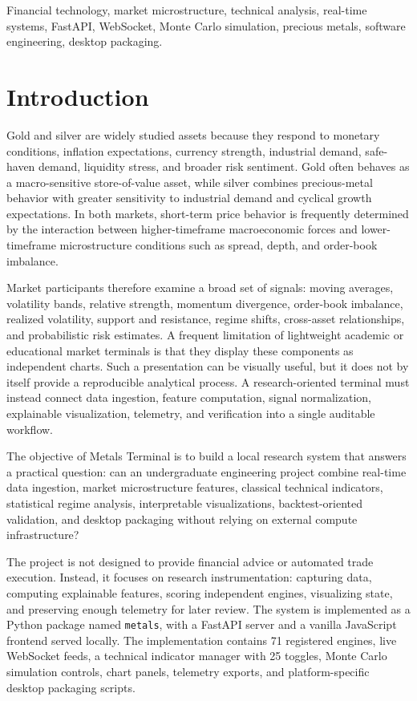 \documentclass[conference]{IEEEtran}
\begin{document}
\begin{IEEEkeywords}
Financial technology, market microstructure, technical analysis, real-time
systems, FastAPI, WebSocket, Monte Carlo simulation, precious metals, software
engineering, desktop packaging.
\end{IEEEkeywords}

\section{Introduction}

Gold and silver are widely studied assets because they respond to monetary
conditions, inflation expectations, currency strength, industrial demand,
safe-haven demand, liquidity stress, and broader risk sentiment. Gold often
behaves as a macro-sensitive store-of-value asset, while silver combines
precious-metal behavior with greater sensitivity to industrial demand and
cyclical growth expectations. In both markets, short-term price behavior is
frequently determined by the interaction between higher-timeframe
macroeconomic forces and lower-timeframe microstructure conditions such as
spread, depth, and order-book imbalance.

Market participants therefore examine a broad set of signals: moving
averages, volatility bands, relative strength, momentum divergence,
order-book imbalance, realized volatility, support and resistance, regime
shifts, cross-asset relationships, and probabilistic risk estimates. A
frequent limitation of lightweight academic or educational market terminals
is that they display these components as independent charts. Such a
presentation can be visually useful, but it does not by itself provide a
reproducible analytical process. A research-oriented terminal must instead
connect data ingestion, feature computation, signal normalization,
explainable visualization, telemetry, and verification into a single
auditable workflow.

The objective of Metals Terminal is to build a local research system that
answers a practical question: can an undergraduate engineering project
combine real-time data ingestion, market microstructure features, classical
technical indicators, statistical regime analysis, interpretable
visualizations, backtest-oriented validation, and desktop packaging without
relying on external compute infrastructure?

The project is not designed to provide financial advice or automated trade
execution. Instead, it focuses on research instrumentation: capturing data,
computing explainable features, scoring independent engines, visualizing
state, and preserving enough telemetry for later review. The system is
implemented as a Python package named \texttt{metals}, with a FastAPI server
and a vanilla JavaScript frontend served locally. The implementation contains
71 registered engines, live WebSocket feeds, a technical indicator manager
with 25 toggles, Monte Carlo simulation controls, chart panels, telemetry
exports, and platform-specific desktop packaging scripts.
\end{document}
